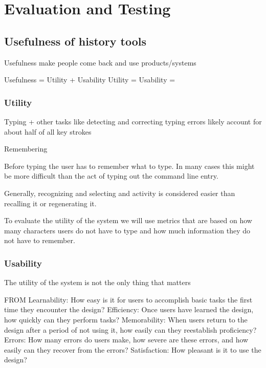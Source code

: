 
\chapter{Evaluation and Testing}


\section{Usefulness of history tools}

Usefulness make people come back and use products/systems

Usefulness = Utility + Usability \cite{nielsen2012usability}
Utility =
Usability =

\subsection{Utility}


Typing + other tasks like detecting and correcting typing errors likely account for about half of all key strokes \cite{whiteside1982people}


Remembering

Before typing the user has to remember what to type. In many cases this might be more difficult than the act of typing out the command line entry.

Generally, recognizing and selecting and activity is considered easier than recalling it or regenerating it. \cite{greenberg1993computer}



To evaluate the utility of the system we will use metrics that are based on how many characters users do not have to type and how much information they do not have to remember.

\subsection{Usability}

The utility of the system is not the only thing that matters


FROM \cite{nielsen2012usability}
Learnability: How easy is it for users to accomplish basic tasks the first time they encounter the design?
Efficiency: Once users have learned the design, how quickly can they perform tasks?
Memorability: When users return to the design after a period of not using it, how easily can they reestablish proficiency?
Errors: How many errors do users make, how severe are these errors, and how easily can they recover from the errors?
Satisfaction: How pleasant is it to use the design?


